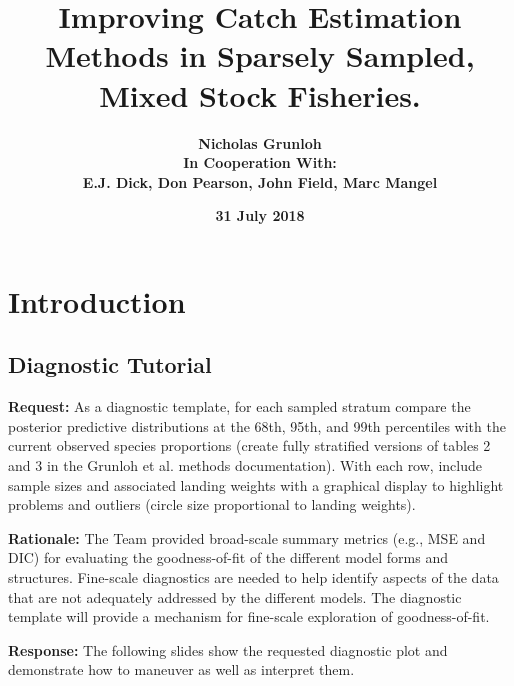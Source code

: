 \documentclass[ xcolor = pdftex, dvipsnames, table ]{beamer}
\begin{document}
%

\title{\textbf{Improving Catch Estimation Methods in Sparsely Sampled, Mixed Stock Fisheries.}}

\author{
\textbf{Nicholas Grunloh }\\\vspace{0.3cm}
\textbf{In Cooperation With:}\\
\textbf{E.J. Dick, Don Pearson, John Field, Marc Mangel}
}


\date{
\textbf{31 July 2018}
}

%
%

%
\section{Introduction}
\subsection{}
\begin{frame}
        \maketitle
\end{frame}

%
%

%
\subsection{Diagnostic Tutorial}
\begin{frame}
\small
\textbf{Request:} 
As a diagnostic template, for each sampled stratum compare the posterior 
predictive distributions at the 68th, 95th, and 99th percentiles with the 
current observed species proportions (create fully stratified versions of 
tables 2 and 3 in the Grunloh et al. methods documentation).  With each row, 
include sample sizes and associated landing weights with a graphical display 
to highlight problems and outliers (circle size proportional to landing 
weights).
  
\textbf{Rationale:}  
The Team provided broad-scale summary metrics (e.g., MSE and DIC) for 
evaluating the goodness-of-fit of the different model forms and structures.  
Fine-scale diagnostics are needed to help identify aspects of the data that 
are not adequately addressed by the different models.  The diagnostic template 
will provide a mechanism for fine-scale exploration of goodness-of-fit.

\textbf{Response:}  
The following slides show the requested diagnostic plot and demonstrate how to 
maneuver as well as interpret them.

\end{frame}
\end{document}
